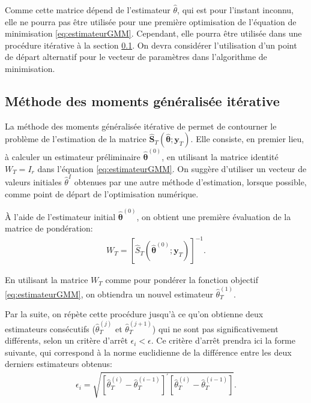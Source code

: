 Comme cette matrice dépend de l'estimateur $\hat\theta$, qui est pour
l'instant inconnu, elle ne pourra pas être utilisée pour une première
optimisation de l'équation de minimisation
\eqref{eq:estimateurGMM}. Cependant, elle pourra être utilisée dans
une procédure itérative à la section \ref{sec:GMMtwostep}. On devra
considérer l'utilisation d'un point de départ alternatif pour le
vecteur de paramètres dans l'algorithme de minimisation.

\subsection{Méthode des moments généralisée itérative}
\label{sec:GMMtwostep}
\nocite{wooldridge2001econometric}

La méthode des moments généralisée itérative de
\cite{hall2005generalized} permet de contourner le problème de
l'estimation de la matrice
$\mathbf{\hat{S}}_T(\mathbf{\hat\theta};\mathbf{y}_T)$. Elle consiste,
en premier lieu, à calculer un estimateur préliminaire
$\mathbf{\hat{\theta}}^{(0)}$, en utilisant la matrice identité $W_T =
I_r$ dans l'équation \eqref{eq:estimateurGMM}. On suggère d'utiliser
un vecteur de valeurs initiales $\hat{\theta}^{I}$ obtenues par une
autre méthode d'estimation, lorsque possible, comme point de départ de
l'optimisation numérique.

À l'aide de l'estimateur initial $\mathbf{\hat{\theta}}^{(0)}$, on
obtient une première évaluation de la matrice de pondération:
\begin{align}
  W_T = \left[\hat{S}_T(\mathbf{\hat{\theta}}^{(0)};\mathbf{y}_T)
  \right]^{-1}.
\end{align}

En utilisant la matrice $W_T$ comme pour pondérer la fonction objectif
\eqref{eq:estimateurGMM}, on obtiendra un nouvel estimateur
$\hat{\theta}_T^{(1)}$.

Par la suite, on répète cette procédure jusqu'à ce qu'on obtienne deux
estimateurs consécutifs ($\hat{\theta}_T^{(j)}$ et
$\hat{\theta}_T^{(j+1)}$) qui ne sont pas significativement
différents, selon un critère d'arrêt $\epsilon_i < \epsilon$.  Ce
critère d'arrêt prendra ici la forme suivante, qui correspond à la
norme euclidienne de la différence entre les deux derniers estimateurs
obtenus:
\begin{align}
  \label{eq:criterearret}
  \epsilon_i =
  \sqrt{\left[\hat\theta^{(i)}_T-\hat\theta^{(i-1)}_T\right]^{\prime}\left[\hat\theta^{(i)}_T-\hat\theta^{(i-1)}_T\right]}.
\end{align}

